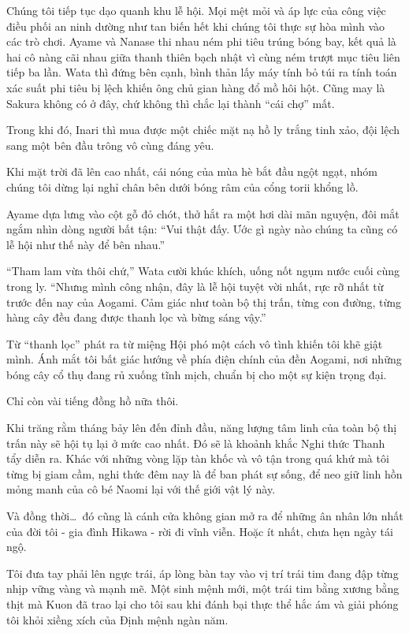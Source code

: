 \documentclass[../main.tex]{subfiles}
\begin{document}
Chúng tôi tiếp tục dạo quanh khu lễ hội. Mọi mệt mỏi và áp lực của công việc điều phối an ninh dường như tan biến hết khi chúng tôi thực sự hòa mình vào các trò chơi. Ayame và Nanase thi nhau ném phi tiêu trúng bóng bay, kết quả là hai cô nàng cãi nhau giữa thanh thiên bạch nhật vì cùng ném trượt mục tiêu liên tiếp ba lần. Wata thì đứng bên cạnh, bình thản lấy máy tính bỏ túi ra tính toán xác suất phi tiêu bị lệch khiến ông chủ gian hàng đổ mồ hôi hột. Cũng may là Sakura không có ở đây, chứ không thì chắc lại thành ``cái chợ'' mất.

Trong khi đó, Inari thì mua được một chiếc mặt nạ hồ ly trắng tinh xảo, đội lệch sang một bên đầu trông vô cùng đáng yêu.

Khi mặt trời đã lên cao nhất, cái nóng của mùa hè bắt đầu ngột ngạt, nhóm chúng tôi dừng lại nghỉ chân bên dưới bóng râm của cổng torii khổng lồ.

Ayame dựa lưng vào cột gỗ đỏ chót, thở hắt ra một hơi dài mãn nguyện, đôi mắt ngắm nhìn dòng người bất tận: ``Vui thật đấy. Ước gì ngày nào chúng ta cũng có lễ hội như thế này để bên nhau.''

``Tham lam vừa thôi chứ,'' Wata cười khúc khích, uống nốt ngụm nước cuối cùng trong ly. ``Nhưng mình công nhận, đây là lễ hội tuyệt vời nhất, rực rỡ nhất từ trước đến nay của Aogami. Cảm giác như toàn bộ thị trấn, từng con đường, từng hàng cây đều đang được thanh lọc và bừng sáng vậy.''

Từ ``thanh lọc'' phát ra từ miệng Hội phó một cách vô tình khiến tôi khẽ giật mình. Ánh mắt tôi bất giác hướng về phía điện chính của đền Aogami, nơi những bóng cây cổ thụ đang rủ xuống tĩnh mịch, chuẩn bị cho một sự kiện trọng đại.

Chỉ còn vài tiếng đồng hồ nữa thôi.

Khi trăng rằm tháng bảy lên đến đỉnh đầu, năng lượng tâm linh của toàn bộ thị trấn này sẽ hội tụ lại ở mức cao nhất. Đó sẽ là khoảnh khắc Nghi thức Thanh tẩy diễn ra. Khác với những vòng lặp tàn khốc và vô tận trong quá khứ mà tôi từng bị giam cầm, nghi thức đêm nay là để ban phát sự sống, để neo giữ linh hồn mỏng manh của cô bé Naomi lại với thế giới vật lý này.

Và đồng thời\dots\ đó cũng là cánh cửa không gian mở ra để những ân nhân lớn nhất của đời tôi - gia đình Hikawa - rời đi vĩnh viễn. Hoặc ít nhất, chưa hẹn ngày tái ngộ.

Tôi đưa tay phải lên ngực trái, áp lòng bàn tay vào vị trí trái tim đang đập từng nhịp vững vàng và mạnh mẽ. Một sinh mệnh mới, một trái tim bằng xương bằng thịt mà Kuon đã trao lại cho tôi sau khi đánh bại thực thể hắc ám và giải phóng tôi khỏi xiềng xích của Định mệnh ngàn năm.
\end{document}
